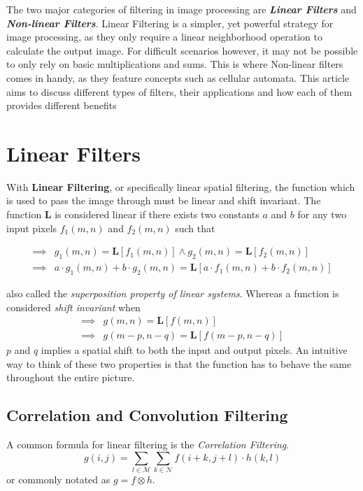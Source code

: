 \documentclass[twoside,a4paper,article]{combine}
\begin{document}
The two major categories of filtering in image processing are \textbf{\emph{Linear Filters}} and \textbf{\emph{Non-linear Filters}}. Linear Filtering is a simpler, yet powerful strategy for image processing, as they
only require a linear neighborhood operation to calculate the output image. For difficult scenarios however, it may not be possible to only rely on basic multiplications and sums. This is where Non-linear filters comes in handy, as they
feature concepts such as cellular automata. This article aims to discuss different types of filters, their applications and how each of them provides different benefits\footnotemark{}
\section{Linear Filters}
With \textbf{Linear Filtering}, or specifically linear spatial filtering, the function which is used to pass the image through
must be linear and shift invariant. The function $\pmb{L}$ is considered linear if there exists two constants $a$ and $b$ for any
two input pixels $f_1(m, n)$ and $f_2(m, n)$ such that

\begin{align*}
    \implies & g_1(m, n) = \boldsymbol{L} [f_1(m, n)] \land g_2(m, n) = \boldsymbol{L} [f_2(m, n)] \\
    \implies & a \cdot g_1(m, n) + b \cdot g_2(m, n) = \boldsymbol{L} [a \cdot f_1(m, n) + b \cdot f_2(m, n)]
\end{align*}

also called the \emph{superposition property of linear systems}\cite{BovikActon09}. Whereas a function is considered \emph{shift invariant} when
\begin{align*}
    \implies & g(m, n) = \boldsymbol{L} [f(m, n)]\\
    \implies & g(m - p, n - q) =  \boldsymbol{L} [f(m - p, n - q)]
\end{align*} $p$ and $q$ implies a spatial shift to both the input and output pixels\cite{BovikActon09}. An intuitive way to think
of these two properties is that the function has to behave the same throughout the entire picture.

\subsection{Correlation and Convolution Filtering}
A common formula for linear filtering is the \emph{Correlation Filtering}\cite{BovikActon09}. 
\[
    g(i,j) = \sum_{l \in \mathscr{M}}\sum_{k \in \mathscr{N}}{f(i+k, j+l) \cdot h(k, l)}
\]
or commonly notated as $g = f \otimes h$.
\end{document}
